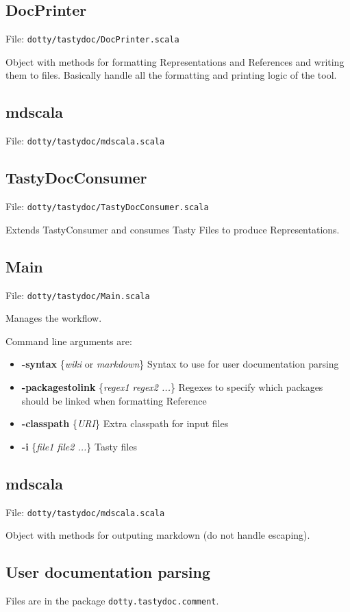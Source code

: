 \documentclass{report}
\begin{document}
\subsection{DocPrinter}
File: \texttt{dotty/tastydoc/DocPrinter.scala}

Object with methods for formatting Representations and References and writing them to files. Basically handle all the formatting and printing logic of the tool.

\subsection{mdscala}
File: \texttt{dotty/tastydoc/mdscala.scala}

\subsection{TastyDocConsumer}
File: \texttt{dotty/tastydoc/TastyDocConsumer.scala}

Extends TastyConsumer and consumes Tasty Files to produce Representations.

\subsection{Main}
File: \texttt{dotty/tastydoc/Main.scala}

Manages the workflow.

Command line arguments are:
\begin{itemize}
    \item \textbf{-syntax} \{\textit{wiki} or \textit{markdown}\} Syntax to use for user documentation parsing
    \item \textbf{-packagestolink} \{\textit{regex1 regex2 ...}\} Regexes to specify which packages should be linked when formatting Reference
    \item \textbf{-classpath} \{\textit{URI}\} Extra classpath for input files
    \item \textbf{-i} \{\textit{file1 file2 ...}\} Tasty files
\end{itemize}

\subsection{mdscala}
File: \texttt{dotty/tastydoc/mdscala.scala}

Object with methods for outputing markdown (do not handle escaping).

\subsection{User documentation parsing}
Files are in the package \texttt{dotty.tastydoc.comment}.
\end{document}

